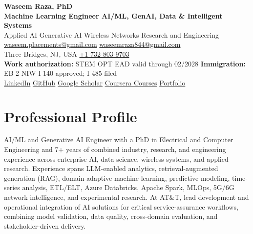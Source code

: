 \documentclass[9pt,letterpaper]{extarticle}
\begin{document}
\begin{center}
{\LARGE\bfseries Waseem Raza, PhD}{\normalsize\mdseries }\\[2pt]
{\large\bfseries Machine Learning Engineer \textbar{} AI/ML, GenAI, Data \& Intelligent Systems}\\[1pt]
{\small Applied AI \textbar{} Generative AI \textbar{} Wireless Networks \textbar{} Research and Engineering}\\[3pt]
{\footnotesize {}\enspace \href{mailto:waseem.placements@gmail.com}{waseem.placements@gmail.com} \textbar{} \href{mailto:waseemraza844@gmail.com}{waseemraza844@gmail.com}\\[1pt]Three Bridges, NJ, USA \quad {}\enspace \href{tel:+17328039703}{+1 732-803-9703}\\[1pt]{\scriptsize \textbf{Work authorization:} STEM OPT EAD valid through 02/2028 \textbar{} \textbf{Immigration:} EB-2 NIW I-140 approved; I-485 filed}\\[1pt]\href{https://www.linkedin.com/in/waseem-raza-phd-9a737858/}{LinkedIn} \textbar{} \href{https://github.com/WaseemRaza844}{GitHub} \textbar{} \href{https://scholar.google.com/citations?user=d58Drr0AAAAJ\&hl=en}{Google Scholar} \textbar{} \href{https://waseemraza844.github.io/portfolio/learning.html}{Coursera Courses} \textbar{} \href{https://waseemraza844.github.io/portfolio/}{Portfolio}}
\end{center}
\vspace{-5pt}
\section{Professional Profile}
AI/ML and Generative AI Engineer with a PhD in Electrical and Computer Engineering and 7+ years of combined industry, research, and engineering experience across enterprise AI, data science, wireless systems, and applied research. Experience spans LLM-enabled analytics, retrieval-augmented generation (RAG), domain-adaptive machine learning, predictive modeling, time-series analysis, ETL/ELT, Azure Databricks, Apache Spark, MLOps, 5G/6G network intelligence, and experimental research. At AT\&T, lead development and operational integration of AI solutions for critical service-assurance workflows, combining model validation, data quality, cross-domain evaluation, and stakeholder-driven delivery.
\end{document}
